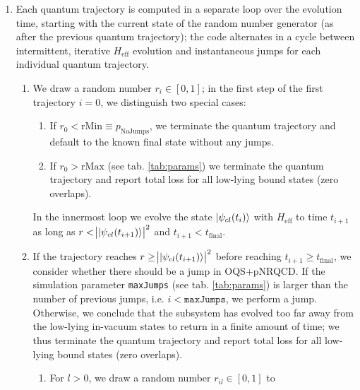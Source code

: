 \documentclass[times,sort&compress,final]{elsarticle}
\def\qtraj{{\tt QTraj} }
\begin{document}
\begin{enumerate}
    recorded; the corresponding final state norm equals the probability of no jumps at all, 
    $p_\text{NoJumps}$.
    The outermost loop of \qtraj is over a set of \texttt{nTrajectories} quantum trajectories for 
    the given initial condition. 
    \item
    Each quantum trajectory is computed in a separate loop over the evolution time, starting with 
    the current state of the random number generator (as after the previous quantum trajectory);
    the code alternates in a cycle between intermittent, iterative $H_\text{eff}$ evolution and 
    instantaneous jumps for each individual quantum trajectory.
    \begin{enumerate}
        \item 
        We draw a random number $r_i \in [0,1]$; 
        in the first step of the first trajectory $i=0$, we distinguish two special cases: 
        \begin{enumerate}
            \item
            If $r_0 < \mathrm{rMin} \equiv p_\text{NoJumps}$, we terminate the quantum trajectory and 
            default to the known final state without any jumps.
            \item
            If $r_0 > \mathrm{rMax}$ (see tab. \ref{tab:params}) we terminate the quantum trajectory 
            and report total loss for all low-lying bound states (zero overlaps).
        \end{enumerate}
        In the innermost loop we evolve the state $\ket{ \psi_{cl} (t_i) }$ with $H_\text{eff}$ 
        to time $t_{i+1}$ as long as $ r < \abs{ \ket{ \psi_{cl} (t_{i+1}) } }^2$  and 
        $t_{i+1} < t_\text{final}$.
        \item
        If the trajectory reaches $ r \ge \abs{ \ket{ \psi_{cl} (t_{i+1}) } }^2$ before 
        reaching $t_{i+1} \ge t_\text{final}$, we consider whether there should be a jump in 
         OQS+pNRQCD.  
        If the simulation parameter \texttt{maxJumps} (see tab. \ref{tab:params}) is larger 
        than the number of previous jumps, i.e. $i < \mathtt{maxJumps}$, we perform a jump.
        Otherwise, we conclude that the subsystem has evolved too far away from the 
        low-lying in-vacuum states to return in a finite amount of time; we thus terminate the quantum trajectory and report total loss for all low-lying bound states (zero overlaps).
        \begin{enumerate}
            \item
            For $l>0$, we draw a random number $r_{il} \in [0,1]$ to 

\end{enumerate}
\end{enumerate}
\end{enumerate}
\end{document}

